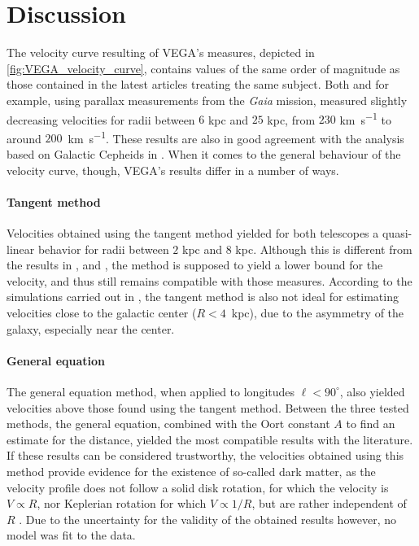 \newpage
\section{Discussion}
The velocity curve resulting of VEGA's measures, depicted in \autoref{fig:VEGA_velocity_curve}, contains values of the same order of magnitude as those contained in the latest articles treating the same subject.
Both \cite{ou_dark_2024} and \cite{eilers_circular_2019} for example, using parallax measurements from the \emph{Gaia} mission, measured slightly decreasing velocities for radii between $6$ kpc and $25$ kpc, from $230$ \si{\kilo\meter\per\second} to around \mbox{$200$ \si{\kilo\meter\per\second}}.
These results are also in good agreement with the analysis based on Galactic Cepheids in \cite{mroz_rotation_2019}.
When it comes to the general behaviour of the velocity curve, though, VEGA's results differ in a number of ways.

\paragraph{Tangent method} 
Velocities obtained using the tangent method yielded for both telescopes a quasi-linear behavior for radii between $2$ kpc and $8$ kpc. Although this is different from the results in \cite{ou_dark_2024}, \cite{eilers_circular_2019} and \cite{mroz_rotation_2019}, the method is supposed to yield a lower bound for the velocity, and thus still remains compatible with those measures.
According to the simulations carried out in \cite{chemin_incorrect_2015}, the tangent method is also not ideal for estimating velocities close to the galactic center \mbox{($R < 4$ kpc)}, due to the asymmetry of the galaxy, especially near the center.

\paragraph{General equation}
The general equation method, when applied to longitudes $\ell < 90^\circ$, also yielded velocities above those found using the tangent method. 
Between the three tested methods, the general equation, combined with the Oort constant $A$ to find an estimate for the distance, yielded the most compatible results with the literature. If these results can be considered trustworthy, the velocities obtained using this method provide evidence for the existence of so-called dark matter, as the velocity profile does not follow a solid disk rotation, for which the velocity is $V \propto R$, nor Keplerian rotation for which $V \propto 1/R$, but are rather independent of $R$ \cite{horellou_SALSA_2015}. Due to the uncertainty for the validity of the obtained results however, no model was fit to the data.

